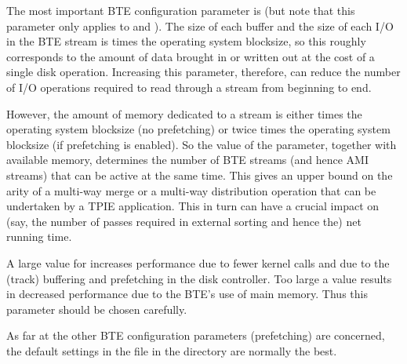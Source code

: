 The most important BTE configuration parameter is
 (but note that this
parameter only applies to  and
).  The size of each buffer and the size of
each I/O in the BTE stream is
 times the operating
system blocksize, so this roughly corresponds to the amount
of data brought in or written out at the cost of a single
disk operation. Increasing this parameter, therefore, can
reduce the number of I/O operations required to read through
a stream from beginning to end.

However, the amount of memory dedicated to a stream is
either  times the
operating system blocksize (no prefetching) or twice
 times the operating
system blocksize (if prefetching is enabled). So the value
of the  parameter,
together with available memory, determines the number of BTE
streams (and hence AMI streams) that can be active at the
same time. This gives an upper bound on the arity of a
multi-way merge or a multi-way distribution operation that
can be undertaken by a TPIE application. This in turn can
have a crucial impact on (say, the number of passes required
in external sorting and hence the) net running time.

A large value for 
increases performance due to fewer kernel calls and due to
the (track) buffering and prefetching in the disk
controller. Too large a value results in decreased
performance due to the BTE's use of main memory. Thus this
parameter should be chosen carefully.


As far at the other BTE configuration parameters (prefetching)
are concerned, the default settings in the  file in the
 directory are normally the best.


